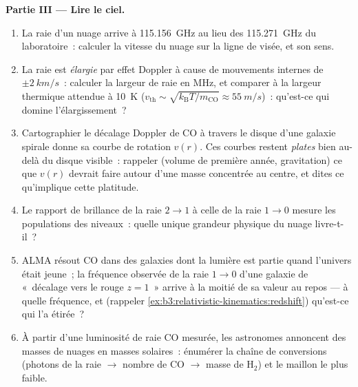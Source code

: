 \begin{problem}
\medskip\noindent\textbf{Partie III --- Lire le ciel.}
\begin{enumerate}[resume]
  \item La raie d'un nuage arrive à \qty{115.156}{GHz} au lieu des
        \qty{115.271}{GHz} du laboratoire~: calculer la vitesse du
        nuage sur la ligne de visée, et son sens.
  \item La raie est \emph{élargie} par effet Doppler à cause de
        mouvements internes de $\pm\qty{2}{km/s}$~: calculer la
        largeur de raie en MHz, et comparer à la largeur thermique
        attendue à \qty{10}{K}
        ($v_{\text{th}} \sim \sqrt{k_{\text{B}}T/m_{\text{CO}}}
        \approx \qty{55}{m/s}$)~: qu'est-ce qui domine
        l'élargissement~?
  \item Cartographier le décalage Doppler de CO à travers le disque
        d'une galaxie spirale donne sa courbe de rotation $v(r)$. Ces
        courbes restent \emph{plates} bien au-delà du disque
        visible~: rappeler (volume de première année, gravitation) ce
        que $v(r)$ devrait faire autour d'une masse concentrée au
        centre, et dites ce qu'implique cette platitude.
  \item Le rapport de brillance de la raie $2\to1$ à celle de la raie
        $1\to0$ mesure les populations des niveaux~: quelle unique
        grandeur physique du nuage livre-t-il~?
  \item ALMA résout CO dans des galaxies dont la lumière est partie
        quand l'univers était jeune~; la fréquence observée de la raie
        $1 \to 0$ d'une galaxie de «~décalage vers le rouge $z = 1$~»
        arrive à la moitié de sa valeur au repos --- à quelle
        fréquence, et (rappeler
        \cref{ex:b3:relativistic-kinematics:redshift}) qu'est-ce qui
        l'a étirée~?
  \item À partir d'une luminosité de raie CO mesurée, les astronomes
        annoncent des masses de nuages en masses solaires~: énumérer
        la chaîne de conversions (photons de la raie $\to$ nombre de
        CO $\to$ masse de H$_2$) et le maillon le plus faible.
\end{enumerate}


\end{problem}
